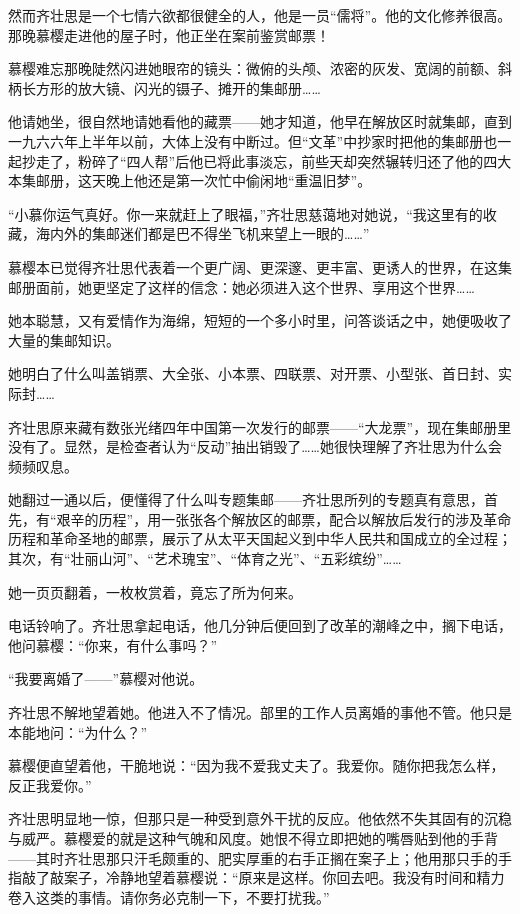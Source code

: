 \par 然而齐壮思是一个七情六欲都很健全的人，他是一员“儒将”。他的文化修养很高。那晚慕樱走进他的屋子时，他正坐在案前鉴赏邮票！
\par 慕樱难忘那晚陡然闪进她眼帘的镜头：微俯的头颅、浓密的灰发、宽阔的前额、斜柄长方形的放大镜、闪光的镊子、摊开的集邮册……
\par 他请她坐，很自然地请她看他的藏票——她才知道，他早在解放区时就集邮，直到一九六六年上半年以前，大体上没有中断过。但“文革”中抄家时把他的集邮册也一起抄走了，粉碎了“四人帮”后他已将此事淡忘，前些天却突然辗转归还了他的四大本集邮册，这天晚上他还是第一次忙中偷闲地“重温旧梦”。
\par “小慕你运气真好。你一来就赶上了眼福，”齐壮思慈蔼地对她说，“我这里有的收藏，海内外的集邮迷们都是巴不得坐飞机来望上一眼的……”
\par 慕樱本已觉得齐壮思代表着一个更广阔、更深邃、更丰富、更诱人的世界，在这集邮册面前，她更坚定了这样的信念：她必须进入这个世界、享用这个世界……
\par 她本聪慧，又有爱情作为海绵，短短的一个多小时里，问答谈话之中，她便吸收了大量的集邮知识。
\par 她明白了什么叫盖销票、大全张、小本票、四联票、对开票、小型张、首日封、实际封……
\par 齐壮思原来藏有数张光绪四年中国第一次发行的邮票——“大龙票”，现在集邮册里没有了。显然，是检查者认为“反动”抽出销毁了……她很快理解了齐壮思为什么会频频叹息。
\par 她翻过一通以后，便懂得了什么叫专题集邮——齐壮思所列的专题真有意思，首先，有“艰辛的历程”，用一张张各个解放区的邮票，配合以解放后发行的涉及革命历程和革命圣地的邮票，展示了从太平天国起义到中华人民共和国成立的全过程；其次，有“壮丽山河”、“艺术瑰宝”、“体育之光”、“五彩缤纷”……
\par 她一页页翻着，一枚枚赏着，竟忘了所为何来。
\par 电话铃响了。齐壮思拿起电话，他几分钟后便回到了改革的潮峰之中，搁下电话，他问慕樱：“你来，有什么事吗？”
\par “我要离婚了——”慕樱对他说。
\par 齐壮思不解地望着她。他进入不了情况。部里的工作人员离婚的事他不管。他只是本能地问：“为什么？”
\par 慕樱便直望着他，干脆地说：“因为我不爱我丈夫了。我爱你。随你把我怎么样，反正我爱你。”
\par 齐壮思明显地一惊，但那只是一种受到意外干扰的反应。他依然不失其固有的沉稳与威严。慕樱爱的就是这种气魄和风度。她恨不得立即把她的嘴唇贴到他的手背——其时齐壮思那只汗毛颇重的、肥实厚重的右手正搁在案子上；他用那只手的手指敲了敲案子，冷静地望着慕樱说：“原来是这样。你回去吧。我没有时间和精力卷入这类的事情。请你务必克制一下，不要打扰我。”
